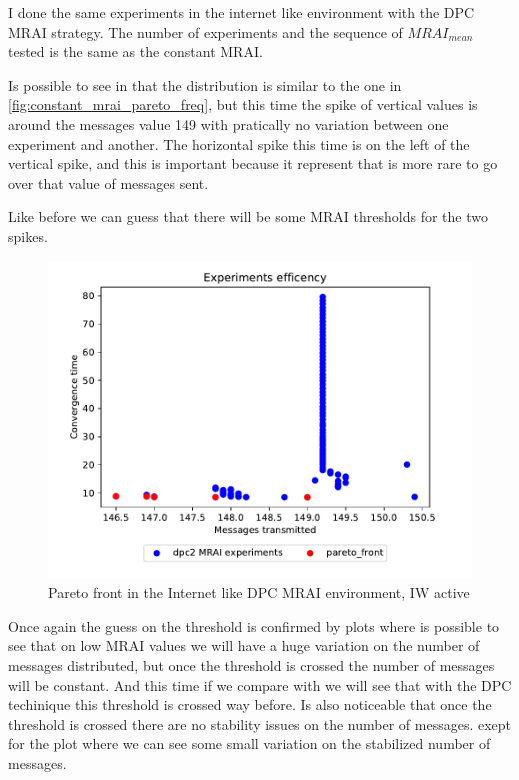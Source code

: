 \documentclass[10pt,conference,letterpaper]{IEEEtran}
\newcommand{\figwidth}{0.78}
\newcommand{\figvspace}{-1.5em}
\begin{document}
I done the same experiments in the internet like environment with the \ac{DPC}
\ac{MRAI} strategy. The number of experiments and the sequence of $MRAI_{mean}$
tested is the same as the constant \ac{MRAI}.

Is possible to see in  that the distribution is
similar to the one in \cref{fig:constant_mrai_pareto_freq}, but this
time the spike of vertical values is around the messages value \num{149} with
pratically no variation between one experiment and another.
The horizontal spike this time is on the left of the vertical spike, and this
is important because it represent that is more rare to go over that value of
messages sent.

Like before we can guess that there will be some \ac{MRAI} thresholds for the 
two spikes.

\begin{figure}[tb]
	\centering
	\includegraphics[width=\figwidth\columnwidth]{images/internet_like/graph-100-dpc/pareto-internet_like-dpc}
	\caption{Pareto front in the Internet like \ac{DPC} \ac{MRAI} environment, IW active}
	\label{fig:dpc_mrai_pareto_freq}
	\vspace{\figvspace}
\end{figure}

Once again the guess on the threshold is confirmed by 
plots where is possible to see that on low \ac{MRAI} values we will have a
huge variation on the number of messages distributed, but once the threshold
is crossed the number of messages will be constant.
And this time if we compare  with 
we will see that with the \ac{DPC} techinique this threshold is crossed way before.
Is also noticeable that once the threshold is crossed there are no stability issues
on the number of messages.
exept for the  plot where we can see some
small variation on the stabilized number of messages.
\end{document}
